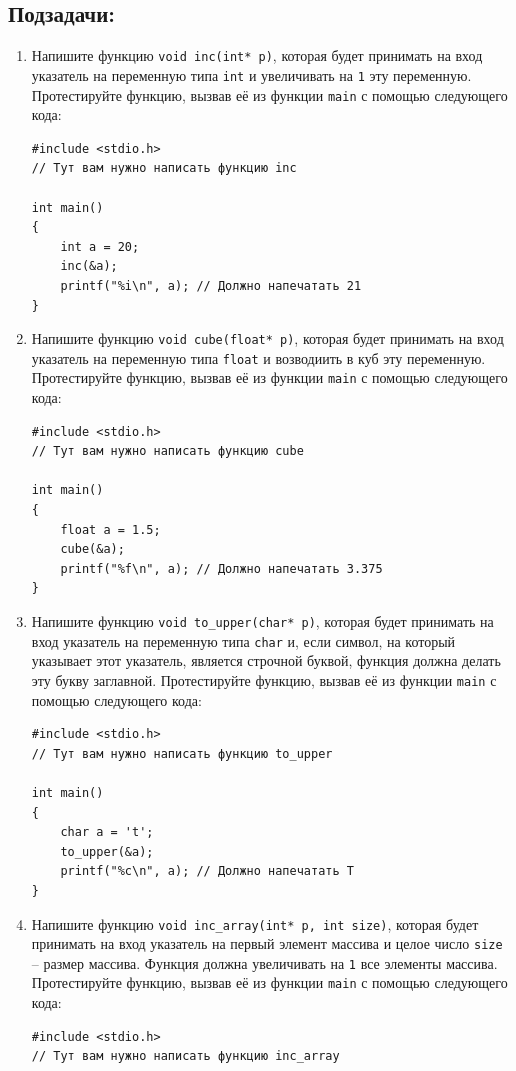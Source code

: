 \documentclass{article}
\begin{document}
\subsection*{Подзадачи:}
\begin{enumerate}
\item Напишите функцию \texttt{void inc(int* p)}, которая будет принимать на вход указатель на переменную типа \texttt{int} и увеличивать на \texttt{1} эту переменную. Протестируйте функцию, вызвав её из функции \texttt{main} с помощью следующего кода:
\begin{lstlisting}
#include <stdio.h>
// Тут вам нужно написать функцию inc

int main() 
{
    int a = 20;
    inc(&a);
    printf("%i\n", a); // Должно напечатать 21
}
\end{lstlisting}
\item Напишите функцию \texttt{void cube(float* p)}, которая будет принимать на вход указатель на переменную типа \texttt{float} и возводиить в куб эту переменную. Протестируйте функцию, вызвав её из функции \texttt{main} с помощью следующего кода: 
\begin{lstlisting}
#include <stdio.h>
// Тут вам нужно написать функцию cube

int main() 
{
    float a = 1.5;
    cube(&a);
    printf("%f\n", a); // Должно напечатать 3.375
}
\end{lstlisting}

\item Напишите функцию \texttt{void to\_upper(char* p)}, которая будет принимать на вход указатель на переменную типа \texttt{char} и, если символ, на который указывает этот указатель, является строчной буквой, функция должна делать эту букву заглавной. Протестируйте функцию, вызвав её из функции \texttt{main} с помощью следующего кода: 
\begin{lstlisting}
#include <stdio.h>
// Тут вам нужно написать функцию to_upper

int main() 
{
    char a = 't';
    to_upper(&a);
    printf("%c\n", a); // Должно напечатать T
}
\end{lstlisting}

\newpage
\item Напишите функцию \texttt{void inc\_array(int* p, int size)}, которая будет принимать на вход указатель на первый элемент массива и целое число \texttt{size} -- размер массива. Функция должна увеличивать на \texttt{1} все элементы массива. Протестируйте функцию, вызвав её из функции \texttt{main} с помощью следующего кода:
\begin{lstlisting}
#include <stdio.h>
// Тут вам нужно написать функцию inc_array


\end{lstlisting}
\end{enumerate}
\end{document}
